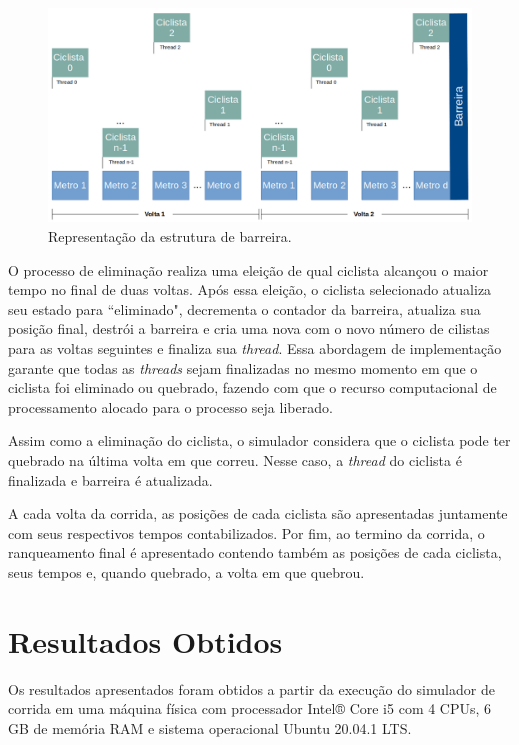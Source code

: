 \documentclass[12pt]{article}
\begin{document}
\begin{figure}[H]
	\centering
	\includegraphics[width=1\textwidth]{barrier.png}
	\caption{Representação da estrutura de barreira.}
	\label{fig:barrier}
\end{figure}

O processo de eliminação realiza uma eleição de qual ciclista alcançou o maior tempo no final de duas voltas. Após essa eleição, o ciclista selecionado atualiza seu estado para ``eliminado", decrementa o contador da barreira, atualiza sua posição final, destrói a barreira e cria uma nova com o novo número de cilistas para as voltas seguintes e finaliza sua \textit{thread}. Essa abordagem de implementação garante que todas as \textit{threads} sejam finalizadas no mesmo momento em que o ciclista foi eliminado ou quebrado, fazendo com que o recurso computacional de processamento alocado para o processo seja liberado.

Assim como a eliminação do ciclista, o simulador considera que o ciclista pode ter quebrado na última volta em que correu. Nesse caso, a \textit{thread} do ciclista é finalizada e barreira é atualizada.

A cada volta da corrida, as posições de cada ciclista são apresentadas juntamente com seus respectivos tempos contabilizados. Por fim, ao termino da corrida, o ranqueamento final é apresentado contendo também as posições de cada ciclista, seus tempos e, quando quebrado, a volta em que quebrou.


\section{Resultados Obtidos}

Os resultados apresentados foram obtidos a partir da execução do simulador de corrida em uma máquina física com processador Intel® Core i5 com 4 CPUs, 6 GB de memória RAM e sistema operacional Ubuntu 20.04.1 LTS.
\end{document}
